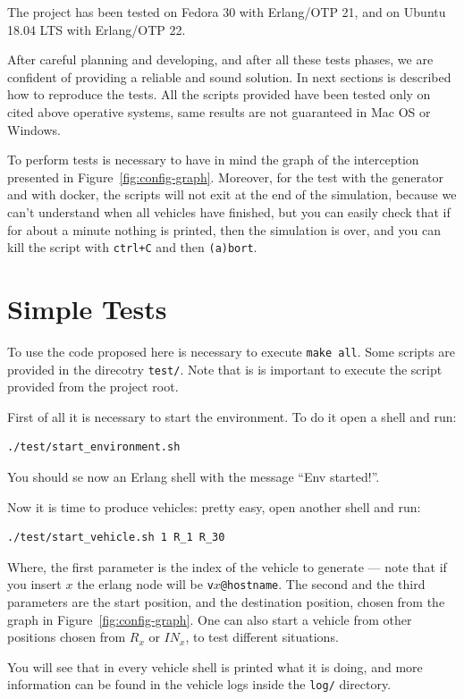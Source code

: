 \documentclass{memoir}
\begin{document}
The project has been tested on Fedora 30 with Erlang/OTP 21, and on Ubuntu 18.04 LTS with Erlang/OTP 22.

After careful planning and developing, and after all these tests phases, we are confident of providing a reliable and sound solution. In next sections is described how to reproduce the tests. All the scripts provided have been tested only on cited above operative systems, same results are not guaranteed in Mac OS or Windows.

To perform tests is necessary to have in mind the graph of the interception presented in Figure~\ref{fig:config-graph}. Moreover, for the test with the generator and with docker, the scripts will not exit at the end of the simulation, because we can't understand when all vehicles have finished, but you can easily check that if for about a minute nothing is printed, then the simulation is over, and you can kill the script with \verb|ctrl+C| and then \verb|(a)bort|.

\section{Simple Tests}
To use the code proposed here is necessary to execute \texttt{make all}. Some scripts are provided in the direcotry \texttt{test/}. Note that is is important to execute the script provided from the project root.

First of all it is necessary to start the environment. To do it open a shell and run:
\begin{verbatim}
./test/start_environment.sh
\end{verbatim}
You should se now an Erlang shell with the message ``Env started!''.

Now it is time to produce vehicles: pretty easy, open another shell and run:
\begin{verbatim}
./test/start_vehicle.sh 1 R_1 R_30
\end{verbatim}
Where, the first parameter is the index of the vehicle to generate --- note that if you insert $x$ the erlang node will be \verb|v|$x$\verb|@hostname|. The second and the third parameters are the start position, and the destination position, chosen from the graph in Figure~\ref{fig:config-graph}. One can also start a vehicle from other positions chosen from $R_x$ or $IN_x$, to test different situations.

You will see that in every vehicle shell is printed what it is doing, and more information can be found in the vehicle logs inside the \texttt{log/} directory.
\end{document}
